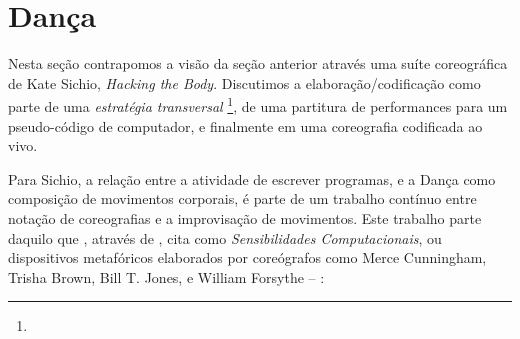 
\section{Dança}\label{sec:coreografia}

Nesta seção contrapomos a visão da seção anterior através uma suíte coreográfica de Kate Sichio, \emph{Hacking the Body}. Discutimos a elaboração/codificação como parte de uma \emph{estratégia transversal} \footnote{}, de uma partitura de performances para um pseudo-código de computador, e finalmente em uma coreografia codificada ao vivo.

Para Sichio, a relação entre a atividade de escrever programas, e a Dança como composição de movimentos corporais, é parte de um trabalho contínuo entre notação de coreografias e a improvisação de movimentos. Este trabalho parte daquilo que , através de , cita como \emph{Sensibilidades Computacionais}, ou dispositivos metafóricos elaborados por coreógrafos como Merce Cunningham, Trisha Brown, Bill T. Jones, e William Forsythe --  \cite[cap.~1, p.~2--4]{downie_choreography_2005}:

